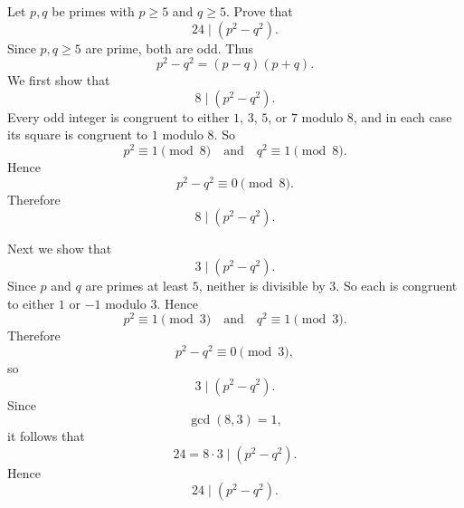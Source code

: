 \begin{problem}{
    Let $p,q$ be primes with $p\geq 5$ and $q\geq 5$.
    Prove that
    \[
        24\mid (p^2-q^2).
    \]
}
    Since $p,q\geq 5$ are prime, both are odd.
    Thus
    \[
        p^2-q^2=(p-q)(p+q).
    \]
    We first show that
    \[
        8\mid (p^2-q^2).
    \]
    Every odd integer is congruent to either $1$, $3$, $5$, or $7$ modulo $8$, and in each case its square is congruent to $1$ modulo $8$.
    So
    \[
        p^2\equiv 1\pmod{8}
        \quad\text{and}\quad
        q^2\equiv 1\pmod{8}.
    \]
    Hence
    \[
        p^2-q^2\equiv 0\pmod{8}.
    \]
    Therefore
    \[
        8\mid (p^2-q^2).
    \]

    Next we show that
    \[
        3\mid (p^2-q^2).
    \]
    Since $p$ and $q$ are primes at least $5$, neither is divisible by $3$.
    So each is congruent to either $1$ or $-1$ modulo $3$.
    Hence
    \[
        p^2\equiv 1\pmod{3}
        \quad\text{and}\quad
        q^2\equiv 1\pmod{3}.
    \]
    Therefore
    \[
        p^2-q^2\equiv 0\pmod{3},
    \]
    so
    \[
        3\mid (p^2-q^2).
    \]
    Since
    \[
        \gcd(8,3)=1,
    \]
    it follows that
    \[
        24=8\cdot 3 \mid (p^2-q^2).
    \]
    Hence
    \[
        24\mid (p^2-q^2).
    \]
\end{problem}